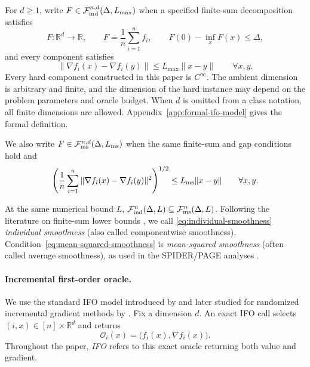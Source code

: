 \documentclass{article}
\newcommand{\R}{\mathbb{R}}
\theoremstyle{definition}
\begin{document}
For $d\ge1$, write $F\in\mathcal F_{\rm ind}^{n,d}(\Delta,L_{\max})$ when a
specified finite-sum decomposition satisfies
\begin{equation}
 F:\R^d\to\R,
 \qquad F=\frac1n\sum_{i=1}^nf_i,
 \qquad F(0)-\inf_xF(x)\le\Delta,
 \label{eq:function-class-gap}
\end{equation}
and every component satisfies
\begin{equation}
 \|\nabla f_i(x)-\nabla f_i(y)\|
 \le L_{\max}\|x-y\|
 \qquad\forall x,y.
 \label{eq:individual-smoothness}
\end{equation}
Every hard component constructed in this paper is $C^\infty$.
The ambient dimension is arbitrary and
finite, and the dimension of the hard instance may depend on the problem parameters
and oracle budget.  When $d$ is omitted from a class notation, all finite
dimensions are allowed.  Appendix~\ref{app:formal-ifo-model} gives the formal
definition.

We also write $F\in\mathcal F_{\rm ms}^{n,d}(\Delta,L_{\rm ms})$ when
the same finite-sum and gap conditions hold and
\begin{equation}
 \left(\frac1n\sum_{i=1}^n
 \|\nabla f_i(x)-\nabla f_i(y)\|^2\right)^{1/2}
 \le L_{\rm ms}\|x-y\|
 \qquad\forall x,y.
 \label{eq:mean-squared-smoothness}
\end{equation}

At the same numerical bound $L$,
$\mathcal F_{\rm ind}^n(\Delta,L)\subseteq
\mathcal F_{\rm ms}^n(\Delta,L)$.
Following the literature on finite-sum lower bounds
\citep{zhou2019lower,emmenegger2022oracle,han2024lower}, we call
\eqref{eq:individual-smoothness} \emph{individual smoothness} (also called componentwise smoothness).
Condition~\eqref{eq:mean-squared-smoothness} is
\emph{mean-squared smoothness} (often called average smoothness), as used in
the SPIDER/PAGE analyses \citep{fang2018spider,li2021page}.

\paragraph{Incremental first-order oracle.}
We use the standard IFO model introduced by \citet{agarwal2015lower} and later
studied for randomized incremental gradient methods by
\citet{lan2018optimal}.  Fix a dimension $d$.  An exact IFO call selects
$(i,x)\in[n]\times\R^d$ and returns
\begin{equation}
    \mathcal O_i(x)=\bigl(f_i(x),\nabla f_i(x)\bigr).
    \label{eq:ifo-response}
\end{equation}
Throughout the paper, \emph{IFO} refers to this exact oracle returning both
value and gradient.
\end{document}
